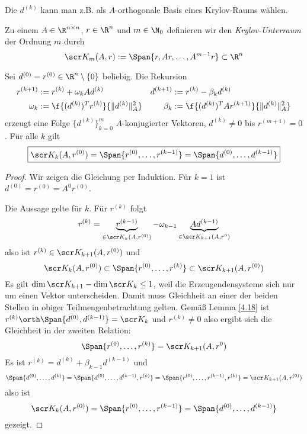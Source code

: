 \documentclass[11pt]{scrartcl}
\begin{document}
Die $d^{(k)}$ kann man z.B. als $A$-orthogonale Basis eines Krylov-Raums wählen.

\begin{df} \label{4.19}
	Zu einem $A \in \R^{n\times n}$, $r\in \R^n$ und $m\in \N_0$ definieren wir den \emph{Krylov-Unterraum} der Ordnung $m$  durch
	\[
		\scr K_m(A, r) := \Span\{ r, Ar, \dotsc, A^{m-1}r \} \subset \R^n
	\]
\end{df}

\begin{st} \label{4.20}
	Sei $d^{(0)} = r^{(0)} \in \R^n \setminus \{0\}$ beliebig.
	Die Rekursion
	\begin{align*}
		r^{(k+1)} &:= r^{(k)} + \omega_k Ad^{(k)}
		& d^{(k+1)} &:= r^{(k)} - \beta_k d^{(k)} \\
		\omega_k &:= \f {(d^{(k)})^T r^{(k)}}{\|d^{(k)}\|_A^2}
		& \beta_k &:= \f{(d^{(k)})^T Ar^{(k+1)}}{\|d^{(k)}\|_A^2}
	\end{align*}
	erzeugt eine Folge $\{d^{(k)}\}_{k=0}^m$ $A$-konjugierter Vektoren, $d^{(k)} \neq 0$ bis $r^{(m+1)} = 0$.
	Für alle $k$ gilt
	\[
		\boxed{
			\scr K_k(A, r^{(0)}) = \Span\{r^{(0)}, \dotsc, r^{(k-1)}\} = \Span \{d^{(0)}, \dotsc, d^{(k-1)} \}
		}
	\]
	\begin{proof}
		Wir zeigen die Gleichung per Induktion.
		Für $k=1$ ist $d^{(0)} = r^{(0)} = A^0r^{(0)}$.

		Die Aussage gelte für $k$. Für $r^{(k)}$ folgt
		\[
			r^{(k)} = \underbrace{r^{(k-1)}}_{\in \scr K_k(A, r^{(0)})} - \omega_{k-1} \underbrace{A d^{(k-1)}}_{\in \scr K_{k+1}(A, r^{0})}
		\]
		also ist $r^{(k)} \in \scr K_{k+1}(A, r^{(0)})$ und
		\[
			\scr K_k(A, r^{(0)}) \subset \Span\{r^{(0)}, \dotsc, r^{(k)}\} \subset \scr K_{k+1}(A, r^{(0)})
		\]
		Es gilt $\dim \scr K_{k+1} - \dim \scr K_k \le 1$, weil die Erzeugendensysteme sich nur um einen Vektor unterscheiden.
		Damit muss Gleichheit an einer der beiden Stellen in obiger Teilmengenbetrachtung gelten.
		Gemäß Lemma \ref{4.18} ist $r^{(k)} \orth \Span\{d^{(0)}, d^{(k-1)}\} = \scr K_k$ und $r^{(k)} \neq 0$ also ergibt sich die Gleichheit in der zweiten Relation:
		\[
			\Span\{r^{(0)}, \dotsc, r^{(k)}\} = \scr K_{k+1} (A,r^{0})
		\]
		Es ist $r^{(k)} = d^{(k)} + \beta_{k-1} d^{(k-1)}$ und 
		\[
			\Span\{d^{(0)}, \dotsc, d^{(k)}\} 
			= \Span\{d^{(0)}, \dotsc, d^{(k-1)}, r^{(k)}\} 
			= \Span\{r^{(0)}, \dotsc, r^{(k-1)}, r^{(k)}\}
			= \scr K_{k+1} (A, r^{(0)})
		\]
		also ist 
		\[
			\scr K_k(A, r^{(0)}) = \Span\{r^{(0)}, \dotsc, r^{(k-1)}\} = \Span \{d^{(0)}, \dotsc, d^{(k-1)} \}
		\]
		gezeigt.


\end{proof}
\end{st}
\end{document}
